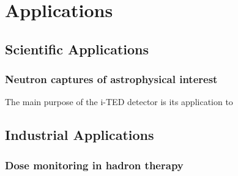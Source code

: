 \chapter{Applications}\label{ch:applications}

\section{Scientific Applications}

\subsection{Neutron captures of astrophysical interest}



The main purpose of the i-TED detector is its application to 

\section{Industrial Applications}

\subsection{Dose monitoring in hadron therapy}


